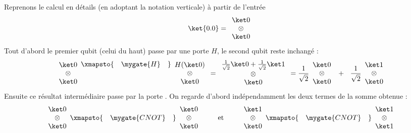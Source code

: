 \documentclass[11pt,class=report,crop=false]{standalone}
\begin{document}
Reprenons le calcul en détails (en adoptant la notation verticale) à partir de l'entrée
$$\ket{0.0} = \begin{array}{c}\ket0\\\otimes\\\ket0\end{array}$$
Tout d'abord le premier qubit (celui du haut) passe par une porte $H$, le second qubit reste inchangé :
$$
\begin{array}{c}\ket0\\\otimes\\\ket0\end{array}
 \raisebox{3ex}{$\xmapsto{\quad\mygate{H}\quad}$}
\begin{array}{c}H(\ket0)\\\otimes\\\ket0\end{array}
= \begin{array}{c}\frac1{\sqrt2}\ket0+\frac1{\sqrt2}\ket1\\\otimes\\\ket0\end{array}
= \frac1{\sqrt2}\begin{array}{c}\ket0\\\otimes\\\ket0\end{array}
\ +\ \ \frac1{\sqrt2}\begin{array}{c}\ket1\\\otimes\\\ket0\end{array}$$
Ensuite ce résultat intermédiaire passe par la porte . On regarde d'abord indépendamment les deux termes de la somme obtenue :
$$\begin{array}{c}\ket0\\\otimes\\\ket0\end{array} \xmapsto{\quad\mygate{CNOT}\quad} \begin{array}{c}\ket0\\\otimes\\\ket0\end{array}
\qquad \text{ et } \qquad
\begin{array}{c}\ket1\\\otimes\\\ket0\end{array} \xmapsto{\quad\mygate{CNOT}\quad} \begin{array}{c}\ket1\\\otimes\\\ket1\end{array}$$
\end{document}
